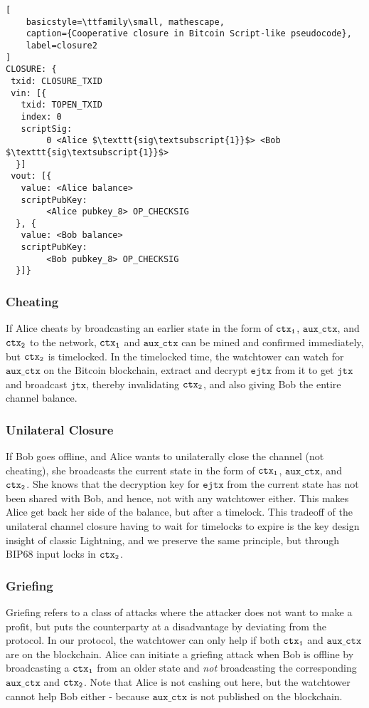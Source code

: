 \begin{lstlisting}[
    basicstyle=\ttfamily\small, mathescape,
    caption={Cooperative closure in Bitcoin Script-like pseudocode},
    label=closure2
]
CLOSURE: {
 txid: CLOSURE_TXID
 vin: [{
   txid: TOPEN_TXID
   index: 0
   scriptSig: 
        0 <Alice $\texttt{sig\textsubscript{1}}$> <Bob $\texttt{sig\textsubscript{1}}$>
  }]
 vout: [{
   value: <Alice balance>
   scriptPubKey: 
        <Alice pubkey_8> OP_CHECKSIG
  }, {
   value: <Bob balance>
   scriptPubKey: 
        <Bob pubkey_8> OP_CHECKSIG
  }]}
\end{lstlisting}


\subsubsection{Cheating}
If Alice cheats by broadcasting an earlier state in the form of $\texttt{ctx\textsubscript{1}}$, $\texttt{aux\_ctx}$, and $\texttt{ctx\textsubscript{2}}$ to the network, $\texttt{ctx\textsubscript{1}}$ and $\texttt{aux\_ctx}$ can be mined and confirmed immediately, but $\texttt{ctx\textsubscript{2}}$ is timelocked. In the timelocked time, the watchtower can watch for $\texttt{aux\_ctx}$ on the Bitcoin blockchain, extract and decrypt $\texttt{ejtx}$ from it to get $\texttt{jtx}$ and broadcast $\texttt{jtx}$, thereby invalidating $\texttt{ctx\textsubscript{2}}$, and also giving Bob the entire channel balance.

\subsubsection{Unilateral Closure}
If Bob goes offline, and Alice wants to unilaterally close the channel (not cheating), she broadcasts the current state in the form of $\texttt{ctx\textsubscript{1}}$, $\texttt{aux\_ctx}$, and $\texttt{ctx\textsubscript{2}}$. She knows that the decryption key for $\texttt{ejtx}$ from the current state has not been shared with Bob, and hence, not with any watchtower either. This makes Alice get back her side of the balance, but after a timelock. This tradeoff of the unilateral channel closure having to wait for timelocks to expire is the key design insight of classic Lightning, and we preserve the same principle, but through BIP68 input locks in $\texttt{ctx\textsubscript{2}}$.

\subsubsection{Griefing}
Griefing refers to a class of attacks where the attacker does not want to make a profit, but puts the counterparty at a disadvantage by deviating from the protocol. In our protocol, the watchtower can only help if both $\texttt{ctx\textsubscript{1}}$ and $\texttt{aux\_ctx}$ are on the blockchain. Alice can initiate a griefing attack when Bob is offline by broadcasting a $\texttt{ctx\textsubscript{1}}$ from an older state and \textit{not} broadcasting the corresponding $\texttt{aux\_ctx}$ and $\texttt{ctx\textsubscript{2}}$. Note that Alice is not cashing out here, but the watchtower cannot help Bob either - because $\texttt{aux\_ctx}$ is not published on the blockchain.

